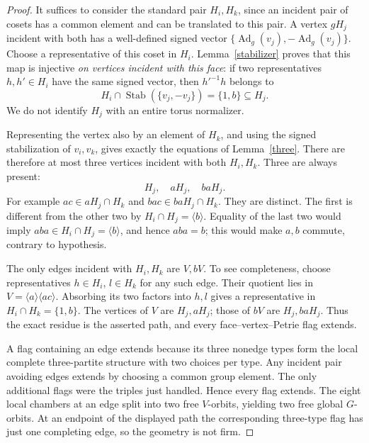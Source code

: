 \documentclass[11pt,a4paper]{article}
\newcommand{\gen}[1]{\langle#1\rangle}
\newcommand{\Ad}{\operatorname{Ad}}
\begin{document}
\begin{proof}
It suffices to consider the standard pair $H_i,H_k$, since an
incident pair of cosets has a common element and can be translated
to this pair. A vertex $gH_j$ incident with both has a well-defined
signed vector $\{\Ad_g(v_j),-\Ad_g(v_j)\}$. Choose a representative
of this coset in $H_i$. Lemma~\ref{stabilizer} proves that this map
is injective \emph{on vertices incident with this face}: if two
representatives $h,h'\in H_i$ have the same signed vector, then
$h'^{-1}h$ belongs to
\[
         H_i\cap\operatorname{Stab}(\{v_j,-v_j\})=\{1,b\}
         \subseteq H_j.
\]
We do not identify $H_j$ with an entire torus normalizer.

Representing the vertex also by an element of $H_k$, and using
the signed stabilization of $v_i,v_k$, gives exactly the equations
of Lemma~\ref{three}. There are therefore at most three vertices
incident with both $H_i,H_k$. Three are always present:
\[
                         H_j,\quad aH_j,\quad baH_j.       \tag{2}
\]
For example $ac\in aH_j\cap H_k$ and
$bac\in baH_j\cap H_k$. They are distinct. The first is different
from the other two by $H_i\cap H_j=\gen b$. Equality of the last
two would imply $aba\in H_i\cap H_j=\gen b$, and hence $aba=b$;
this would make $a,b$ commute, contrary to hypothesis.

The only edges incident with $H_i,H_k$ are $V,bV$. To see
completeness, choose representatives $h\in H_i$, $l\in H_k$ for
any such edge. Their quotient lies in
$V=\gen a\gen{ac}$. Absorbing its two factors into $h,l$ gives
a representative in $H_i\cap H_k=\{1,b\}$.
The vertices of $V$ are $H_j,aH_j$; those of $bV$ are
$H_j,baH_j$. Thus the exact residue is the asserted path, and
every face--vertex--Petrie flag extends.

A flag containing an edge extends because its three nonedge types
form the local complete three-partite structure with two choices
per type. Any incident pair avoiding edges extends by choosing a
common group element. The only additional flags were the triples
just handled. Hence every flag extends. The eight local chambers
at an edge split into two free $V$-orbits, yielding two free global
$G$-orbits. At an endpoint of the displayed path the corresponding
three-type flag has just one completing edge, so the geometry is
not firm.
\end{proof}
\end{document}

